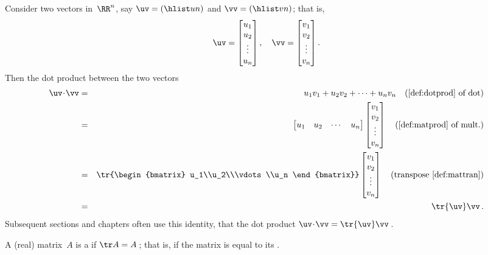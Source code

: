 



\begin{example} \label{eg:trdp}
Consider two vectors in~\(\RR^n\), say \(\uv=(\hlist un)\) and \(\vv=(\hlist vn)\); that is,
\begin{equation*}
\uv=\begin{bmatrix} u_1\\u_2\\\vdots\\u_n \end{bmatrix},\quad
\vv=\begin{bmatrix} v_1\\v_2\\\vdots\\v_n \end{bmatrix}.
\end{equation*}
Then the dot product between the two vectors
\begin{eqnarray*}
\uv\cdot\vv&=&u_1v_1+u_2v_2+\cdots+u_nv_n \quad(\text{\autoref{def:dotprod} of dot})
\\&=&\begin{bmatrix} u_1&u_2&\cdots&u_n \end{bmatrix}
\begin{bmatrix} v_1\\v_2\\\vdots\\v_n \end{bmatrix}\quad(\text{\autoref{def:matprod} of mult.})
\\&=&\tr{\begin{bmatrix} u_1\\u_2\\\vdots\\u_n \end{bmatrix}}
\begin{bmatrix} v_1\\v_2\\\vdots\\v_n \end{bmatrix}\quad(\text{transpose \autoref{def:mattran}})
\\&=&\tr{\uv}\vv\,.
\end{eqnarray*}
Subsequent sections and chapters often use this identity, that the dot product \(\uv\cdot\vv=\tr{\uv}\vv\)\,.
\end{example}


\begin{definition}[symmetry] \label{def:matsym}
A (real) matrix~\(A\) is a  if \(\tr A=A\)\,; that is, if the matrix is equal to its .
\end{definition}

